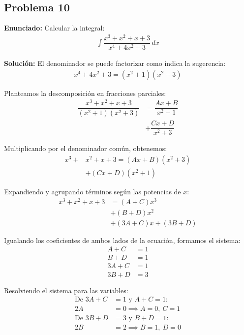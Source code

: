 \subsection*{Problema 10}

\textbf{Enunciado:} Calcular la integral:
\begin{align*}
\int \dfrac{x^3 + x^2 + x + 3}{x^4 + 4x^2 + 3} \, dx
\end{align*}

\textbf{Solución:} El denominador se puede factorizar como indica la sugerencia:
\begin{align*}
x^4 + 4x^2 + 3 = (x^2 + 1)(x^2 + 3)
\end{align*}

Planteamos la descomposición en fracciones parciales:
\begin{align*}
\dfrac{x^3 + x^2 + x + 3}{(x^2 + 1)(x^2 + 3)} &= \dfrac{Ax + B}{x^2 + 1} \\
&+ \dfrac{Cx + D}{x^2 + 3}
\end{align*}

Multiplicando por el denominador común, obtenemos:
\begin{align*}
x^3 + &x^2 + x + 3 = (Ax + B)(x^2 + 3) \\
&+ (Cx + D)(x^2 + 1)
\end{align*}

Expandiendo y agrupando términos según las potencias de $x$:
\begin{align*}
x^3 + x^2 + x + 3 &= (A + C)x^3 \\
&+ (B + D)x^2 \\
&+ (3A + C)x + (3B + D)
\end{align*}

Igualando los coeficientes de ambos lados de la ecuación, formamos el sistema:
\begin{align*}
A + C &= 1 \\
B + D &= 1 \\
3A + C &= 1 \\
3B + D &= 3
\end{align*}

Resolviendo el sistema para las variables:
\begin{align*}
\text{De } 3A + C &= 1 \text{ y } A + C = 1: \\
2A &= 0 \implies A = 0, \ C = 1 \\
\text{De } 3B + D &= 3 \text{ y } B + D = 1: \\
2B &= 2 \implies B = 1, \ D = 0
\end{align*}

